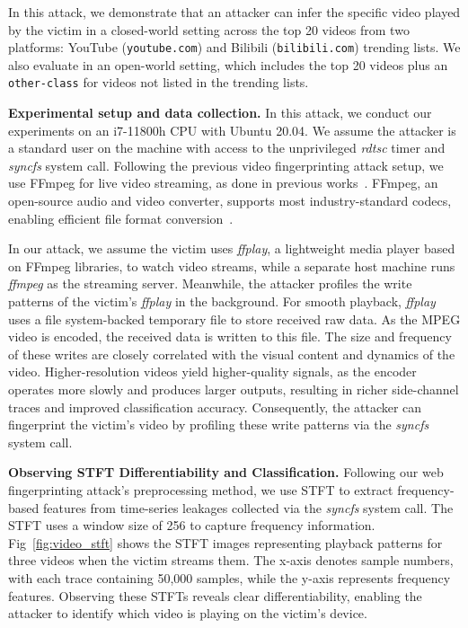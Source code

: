 In this attack, we demonstrate that an attacker can infer the specific video played by the victim in a closed-world setting across the top 20 videos from two platforms: YouTube (\texttt{youtube.com}) and Bilibili (\texttt{bilibili.com}) trending lists. We also evaluate in an open-world setting, which includes the top 20 videos plus an \texttt{other-class} for videos not listed in the trending lists.

\textbf{{Experimental setup and data collection.}} In this attack, we conduct our experiments on an i7-11800h CPU with Ubuntu 20.04. We assume the attacker is a standard user on the machine with access to the unprivileged \textit{rdtsc} timer and \textit{syncfs} system call. Following the previous video fingerprinting attack setup, we use FFmpeg for live video streaming, as done in previous works~\cite{singh2018video, gu2018walls, garboan2012camcorder, blaskiewicz2020droppix}. FFmpeg, an open-source audio and video converter, supports most industry-standard codecs, enabling efficient file format conversion~\cite{tomar2006converting}. 

In our attack, we assume the victim uses \textit{ffplay}, a lightweight media player based on FFmpeg libraries, to watch video streams, while a separate host machine runs \textit{ffmpeg} as the streaming server. Meanwhile, the attacker profiles the write patterns of the victim's \textit{ffplay} in the background. For smooth playback, \textit{ffplay} uses a file system-backed temporary file to store received raw data. As the MPEG video is encoded, the received data is written to this file. The size and frequency of these writes are closely correlated with the visual content and dynamics of the video. Higher-resolution videos yield higher-quality signals, as the encoder operates more slowly and produces larger outputs, resulting in richer side-channel traces and improved classification accuracy. Consequently, the attacker can fingerprint the victim’s video by profiling these write patterns via the \textit{syncfs} system call.


 \textbf{Observing STFT Differentiability and Classification.} Following our web fingerprinting attack’s preprocessing method, we use STFT to extract frequency-based features from time-series leakages collected via the \textit{syncfs} system call. The STFT uses a window size of 256 to capture frequency information. Fig~\ref{fig:video_stft} shows the STFT images representing playback patterns for three videos when the victim streams them. The x-axis denotes sample numbers, with each trace containing 50,000 samples, while the y-axis represents frequency features. Observing these STFTs reveals clear differentiability, enabling the attacker to identify which video is playing on the victim’s device.

